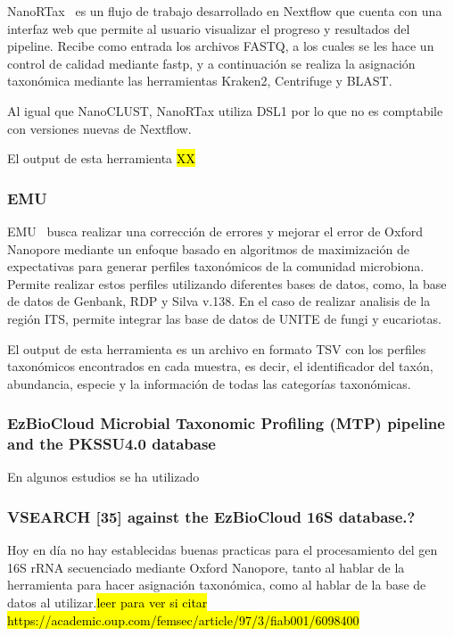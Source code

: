 NanoRTax~\cite{RODRIGUEZPEREZ20225350} es un flujo de trabajo desarrollado en Nextflow que cuenta con una interfaz web que permite al usuario visualizar el progreso y resultados del pipeline.
Recibe como entrada los archivos FASTQ, a los cuales se les hace un control de calidad mediante fastp, y a continuación se realiza la asignación taxonómica mediante las herramientas Kraken2, Centrifuge y BLAST. 

Al igual que NanoCLUST, NanoRTax utiliza DSL1 por lo que no es comptabile con versiones nuevas de Nextflow.

El output de esta herramienta \hl{XX}
\subsubsection{EMU}
EMU~\cite{curry2022emu} busca realizar una corrección de errores y mejorar el error de Oxford Nanopore mediante un enfoque basado en algoritmos de maximización de expectativas para generar perfiles taxonómicos de la comunidad microbiona. Permite realizar estos perfiles utilizando diferentes bases de datos, como, la base de datos de Genbank,  RDP y Silva v.138. En el caso de realizar analisis de la región ITS, permite integrar las base de datos de UNITE de fungi y eucariotas.

El output de esta herramienta es un archivo en formato TSV con los perfiles taxonómicos encontrados en cada muestra, es decir, el identificador del taxón, abundancia, especie y la información de todas las categorías taxonómicas. 

\subsubsection{EzBioCloud Microbial Taxonomic Profiling (MTP) pipeline and the PKSSU4.0 database}
En algunos estudios se ha utilizado %
\subsubsection{VSEARCH [35] against the EzBioCloud 16S database.?}

Hoy en día no hay establecidas buenas practicas para el procesamiento del gen 16S rRNA secuenciado mediante Oxford Nanopore, tanto al hablar de la herramienta para hacer asignación taxonómica, como al hablar de la base de datos al utilizar.\hl{leer para ver si citar https://academic.oup.com/femsec/article/97/3/fiab001/6098400}

